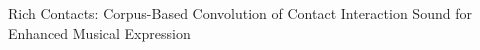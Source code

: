Rich Contacts: Corpus-Based Convolution of Contact Interaction Sound for Enhanced Musical Expression